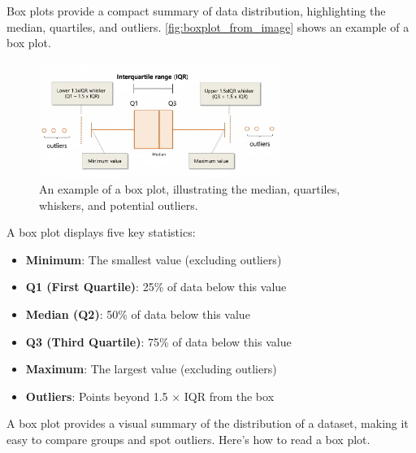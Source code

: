 Box plots provide a compact summary of data distribution, highlighting the median, quartiles, and outliers. \autoref{fig:boxplot_from_image} shows an example of a box plot.

\begin{figure}[htbp]
    \centering
    \includegraphics[width=0.7\textwidth]{figure/boxplot.png}
    \caption{An example of a box plot, illustrating the median, quartiles, whiskers, and potential outliers.}
    \label{fig:boxplot_from_image}
\end{figure}


\begin{definition}
A box plot displays five key statistics:
\begin{itemize}
    \item \textbf{Minimum}: The smallest value (excluding outliers)
    \item \textbf{Q1 (First Quartile)}: 25\% of data below this value
    \item \textbf{Median (Q2)}: 50\% of data below this value
    \item \textbf{Q3 (Third Quartile)}: 75\% of data below this value
    \item \textbf{Maximum}: The largest value (excluding outliers)
    \item \textbf{Outliers}: Points beyond 1.5 × IQR from the box
\end{itemize}
\end{definition}

A box plot provides a visual summary of the distribution of a dataset, making it easy to compare groups and spot outliers. Here's how to read a box plot.

